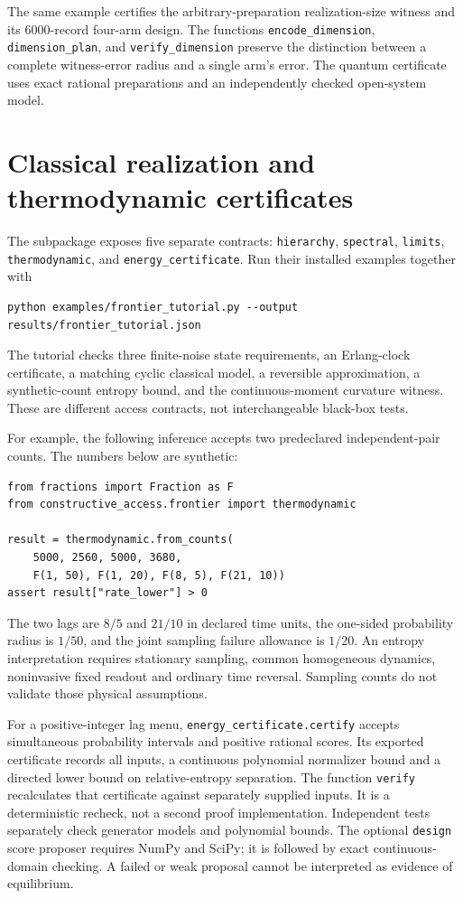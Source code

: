 The same example certifies the arbitrary-preparation realization-size witness
and its 6000-record four-arm design. The functions
\texttt{encode\_dimension}, \texttt{dimension\_plan}, and
\texttt{verify\_dimension} preserve the distinction between a complete
witness-error radius and a single arm's error. The quantum certificate uses
exact rational preparations and an independently checked open-system model.


\section{Classical realization and thermodynamic certificates}
The  subpackage exposes five separate
contracts: \texttt{hierarchy}, \texttt{spectral}, \texttt{limits},
\texttt{thermodynamic}, and \texttt{energy\_certificate}. Run their installed
examples together with
\begin{verbatim}
python examples/frontier_tutorial.py --output results/frontier_tutorial.json
\end{verbatim}
The tutorial checks three finite-noise state requirements, an Erlang-clock
certificate, a matching cyclic classical model, a reversible approximation,
a synthetic-count entropy bound, and the continuous-moment curvature witness.
These are different access contracts, not interchangeable black-box tests.

For example, the following inference accepts two predeclared independent-pair
counts. The numbers below are synthetic:
\begin{verbatim}
from fractions import Fraction as F
from constructive_access.frontier import thermodynamic

result = thermodynamic.from_counts(
    5000, 2560, 5000, 3680,
    F(1, 50), F(1, 20), F(8, 5), F(21, 10))
assert result["rate_lower"] > 0
\end{verbatim}
The two lags are $8/5$ and $21/10$ in declared time units, the one-sided
probability radius is $1/50$, and the joint sampling failure allowance is
$1/20$. An entropy interpretation requires stationary sampling, common
homogeneous dynamics, noninvasive fixed readout and ordinary time reversal.
Sampling counts do not validate those physical assumptions.

For a positive-integer lag menu, \texttt{energy\_certificate.certify} accepts
simultaneous probability intervals and positive rational scores. Its exported
certificate records all inputs, a continuous polynomial normalizer bound and
a directed lower bound on relative-entropy separation. The function
\texttt{verify} recalculates that certificate against separately supplied
inputs. It is a deterministic recheck, not a second proof implementation.
Independent tests separately check generator models and polynomial bounds.
The optional \texttt{design} score proposer requires NumPy and SciPy; it is
followed by exact continuous-domain checking. A failed or weak proposal cannot
be interpreted as evidence of equilibrium.

